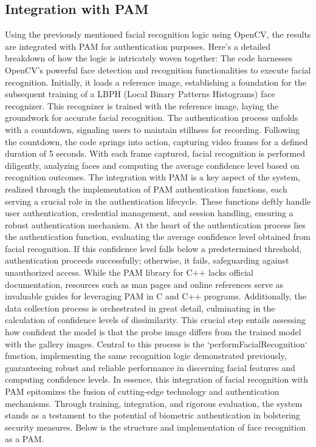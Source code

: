 \documentclass[
]{article}
\begin{document}
\begin{multicols}{2}

\section{Integration with PAM}
Using the previously mentioned facial recognition logic using OpenCV, the results are integrated with PAM for authentication purposes. Here's a detailed breakdown of how the logic is intricately woven together: The code harnesses OpenCV's powerful face detection and recognition functionalities to execute facial recognition. Initially, it loads a reference image, establishing a foundation for the subsequent training of a LBPH (Local Binary Patterns Histograms) face recognizer. This recognizer is trained with the reference image, laying the groundwork for accurate facial recognition. The authentication process unfolds with a countdown, signaling users to maintain stillness for recording. Following the countdown, the code springs into action, capturing video frames for a defined duration of 5 seconds. With each frame captured, facial recognition is performed diligently, analyzing faces and computing the average confidence level based on recognition outcomes. The integration with PAM is a key aspect of the system, realized through the implementation of PAM authentication functions, each serving a crucial role in the authentication lifecycle. These functions deftly handle user authentication, credential management, and session handling, ensuring a robust authentication mechanism. At the heart of the authentication process lies the authentication function, evaluating the average confidence level obtained from facial recognition. If this confidence level falls below a predetermined threshold, authentication proceeds successfully; otherwise, it fails, safeguarding against unauthorized access. While the PAM library for C++ lacks official documentation, resources such as man pages and online references serve as invaluable guides for leveraging PAM in C and C++ programs. Additionally, the data collection process is orchestrated in great detail, culminating in the calculation of confidence levels of dissimilarity. This crucial step entails assessing how confident the model is that the probe image differs from the trained model with the gallery images. Central to this process is the `performFacialRecognition` function, implementing the same recognition logic demonstrated previously, guaranteeing robust and reliable performance in discerning facial features and computing confidence levels. In essence, this integration of facial recognition with PAM epitomizes the fusion of cutting-edge technology and authentication mechanisms. Through training, integration, and rigorous evaluation, the system stands as a testament to the potential of biometric authentication in bolstering security measures. Below is the structure and implementation of face recognition as a PAM.

\end{multicols}
\end{document}
